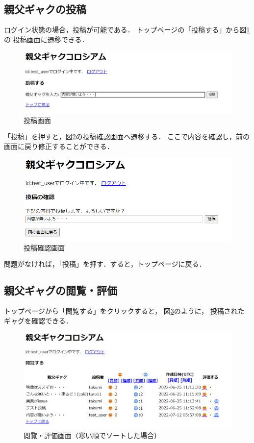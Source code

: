 \documentclass[a4paper,dvipdfmx,11pt]{jsreport}
\begin{document}
\subsection{親父ギャクの投稿}
ログイン状態の場合，投稿が可能である．
トップページの「投稿する」から図\ref{fig:post}の
投稿画面に遷移できる．
\begin{figure}[tb]
  \centering
  \includegraphics*[width=14cm]{img/post.png}
  \caption{投稿画面\label{fig:post}}
\end{figure}
「投稿」を押すと，図\ref{fig:post_confirm}の投稿確認画面へ遷移する．
ここで内容を確認し，前の画面に戻り修正することができる．
\begin{figure}[tb]
  \centering
  \includegraphics*[width=13cm]{img/post_confirm.png}
  \caption{投稿確認画面\label{fig:post_confirm}}
\end{figure}
問題がなければ，「投稿」を押す．すると，トップページに戻る．

\subsection{親父ギャグの閲覧・評価}
トップページから「閲覧する」をクリックすると，
図\ref{fig:view}のように，
投稿されたギャグを確認できる．
\begin{figure}[tb]
  \centering
  \includegraphics*[width=15cm]{img/view.png}
  \caption{閲覧・評価画面（寒い順でソートした場合）\label{fig:view}}
\end{figure}
\end{document}

